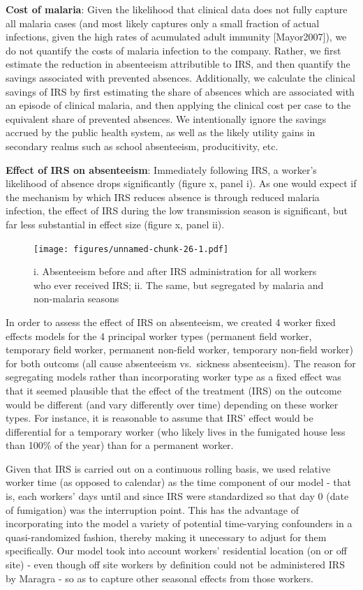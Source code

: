 \documentclass[]{article}
\begin{document}
\textbf{Cost of malaria}: Given the likelihood that clinical data does
not fully capture all malaria cases (and most likely captures only a
small fraction of actual infections, given the high rates of acumulated
adult immunity {[}Mayor2007{]}), we do not quantify the costs of malaria
infection to the company. Rather, we first estimate the reduction in
absenteeism attributible to IRS, and then quantify the savings
associated with prevented absences. Additionally, we calculate the
clinical savings of IRS by first estimating the share of absences which
are associated with an episode of clinical malaria, and then applying
the clinical cost per case to the equivalent share of prevented
absences. We intentionally ignore the savings accrued by the public
health system, as well as the likely utility gains in secondary realms
such as school absenteeism, producitivity, etc.

\textbf{Effect of IRS on absenteeism}: Immediately following IRS, a
worker's likelihood of absence drops significantly (figure x, panel i).
As one would expect if the mechanism by which IRS reduces absence is
through reduced malaria infection, the effect of IRS during the low
transmission season is significant, but far less substantial in effect
size (figure x, panel ii).

\begin{figure}
\centering
\texttt{[image: figures/unnamed-chunk-26-1.pdf]}
\caption{i. Absenteeism before and after IRS administration for all
workers who ever received IRS; ii. The same, but segregated by malaria
and non-malaria seasons}
\end{figure}

In order to assess the effect of IRS on absenteeism, we created 4 worker
fixed effects models for the 4 principal worker types (permanent field
worker, temporary field worker, permanent non-field worker, temporary
non-field worker) for both outcoms (all cause absenteeism vs.~sickness
absenteeism). The reason for segregating models rather than
incorporating worker type as a fixed effect was that it seemed plausible
that the effect of the treatment (IRS) on the outcome would be different
(and vary differently over time) depending on these worker types. For
instance, it is reasonable to assume that IRS' effect would be
differential for a temporary worker (who likely lives in the fumigated
house less than 100\% of the year) than for a permanent worker.

Given that IRS is carried out on a continuous rolling basis, we used
relative worker time (as opposed to calendar) as the time component of
our model - that is, each workers' days until and since IRS were
standardized so that day 0 (date of fumigation) was the interruption
point. This has the advantage of incorporating into the model a variety
of potential time-varying confounders in a quasi-randomized fashion,
thereby making it unecessary to adjust for them specifically. Our model
took into account workers' residential location (on or off site) - even
though off site workers by definition could not be administered IRS by
Maragra - so as to capture other seasonal effects from those workers.
\end{document}
